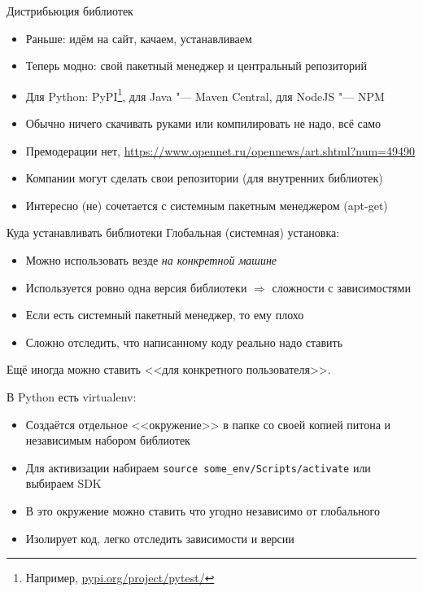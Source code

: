 \begin{frame}[t]{Дистрибьюция библиотек}
	\begin{itemize}
		\item Раньше: идём на сайт, качаем, устанавливаем
		\item Теперь модно: свой пакетный менеджер и центральный репозиторий
		\item Для Python: PyPI\footnote{Например, \href{https://pypi.org/project/pytest/}{pypi.org/project/pytest/}}, для Java "--- Maven Central, для NodeJS "--- NPM
		\item Обычно ничего скачивать руками или компилировать не надо, всё само
		\item Премодерации нет, \href{могут быть вирусы}{https://www.opennet.ru/opennews/art.shtml?num=49490}
		\item Компании могут сделать свои репозитории (для внутренних библиотек)
		\item Интересно (не) сочетается с системным пакетным менеджером (apt-get)
	\end{itemize}
\end{frame}

\begin{frame}[t,fragile]{Куда устанавливать библиотеки}
	Глобальная (системная) установка:
	\begin{itemize}
		\item Можно использовать везде \textit{на конкретной машине}
		\item Используется ровно одна версия библиотеки $\Rightarrow$ сложности с зависимостями
		\item Если есть системный пакетный менеджер, то ему плохо
		\item Сложно отследить, что написанному коду реально надо ставить
	\end{itemize}
	Ещё иногда можно ставить <<для конкретного пользователя>>.
	
	В Python есть virtualenv:
	\begin{itemize}
		\item Создаётся отдельное <<окружение>> в папке со своей копией питона и
			независимым набором библиотек
		\item
			Для активизации набираем \verb`source some_env/Scripts/activate`
			или выбираем SDK
		\item В это окружение можно ставить что угодно независимо от глобального
		\item Изолирует код, легко отследить зависимости и версии
	\end{itemize}
\end{frame}

